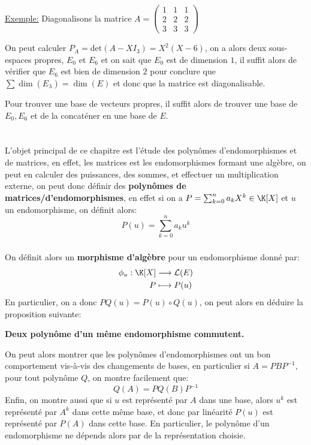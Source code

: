 \underline{Exemple:} Diagonalisons la matrice \(A = \left(\begin{array}{ccc}
   1 & 1 & 1\\
   2 & 2 & 2\\
   3 & 3 & 3
\end{array}\right) \)\< 

On peut calculer \(P_A = \text{det}(A - XI_3) = X^2(X-6)\), on a alors deux sous-espaces propres, \(E_0\) et \(E_6\) et on sait que \(E_0\) est de dimension \(1\), il suffit alors de vérifier que \(E_6\) est bien de dimension \(2\) pour conclure que \(\sum \dim(E_\lambda) = \dim(E)\) et donc que la matrice est diagonalisable.\<

Pour trouver une base de vecteurs propres, il suffit alors de trouver une base de \(E_0, E_6\) et de la concaténer en une base de \(E\).
\chapter*{}
L'objet principal de ce chapitre est l'étude des polynômes d'endomorphismes et de matrices, en effet, les matrices est les endomorphismes formant une algèbre, on peut en calculer des puissances, des sommes, et effectuer un multiplication externe, on peut donc définir des \textbf{polynômes de matrices/d'endomorphismes}, en effet si on a \(P = \sum_{k=0}^{n} a_kX^k \in \K[X]\) et \(u\) un endomorphisme, on définit alors:
\[
   P(u) = \sum_{k=0}^{n}a_k u^k  
\]
\subsection*{}
On définit alors un \textbf{morphisme d'algèbre} pour un endomorphisme donné par:
\[
   \begin{aligned}
      \phi_u:  \K[X] &\longrightarrow \mathcal{L}(E) \\
      P &\longmapsto P(u)
   \end{aligned}
\]
En particulier, on a donc \(PQ(u) = P(u) \circ Q(u)\), on peut alors en déduire la proposition suivante:
\begin{center}
   \textbf{Deux polynôme d'un même endomorphisme commutent.}
\end{center}
On peut alors montrer que les polynômes d'endomorphismes ont un bon comportement vis-à-vis
des changements de bases, en particulier si \(A = PBP^{-1}\), pour tout polynôme \(Q\), on montre facilement que:
\[
   Q(A) = PQ(B)P^{-1}   
\]
Enfin, on montre aussi que si \(u\) est représenté par \(A\) dans une base, alors \(u^k\) est représenté par \(A^k\) dans cette même base, et donc par linéarité \(P(u)\) est représenté par \(P(A)\) dans cette base. En particulier, le polynôme d'un endomorphisme ne dépends alors par de la représentation choisie.
